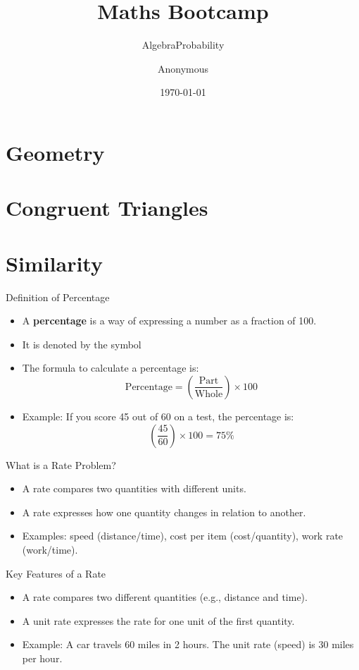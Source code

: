 \documentclass{beamer}
\title{Maths Bootcamp}
\author{Anonymous}
\institute{Overleaf}
\date{\today}
\begin{document}
\frame{\titlepage}

\section{Geometry}
\subsection{}
\section{Congruent Triangles}
\section{Similarity }
\subtitle{Algebra}
\subtitle{Probability}

\begin{frame}{Definition of Percentage}
    \begin{itemize}
        \item A \textbf{percentage} is a way of expressing a number as a fraction of 100.
        \item It is denoted by the symbol 
        \item The formula to calculate a percentage is:
        $$
        \text{Percentage} = \left( \frac{\text{Part}}{\text{Whole}} \right) \times 100
        $$
        \item Example: If you score 45 out of 60 on a test, the percentage is:
      $$  
        \left( \frac{45}{60} \right) \times 100 = 75\%
       $$
    \end{itemize}
\end{frame}

\begin{frame}{What is a Rate Problem?}
    \begin{itemize}
        \item A rate compares two quantities with different units.
        \item A rate expresses how one quantity changes in relation to another.
        \item Examples: speed (distance/time), cost per item (cost/quantity), work rate (work/time).
    \end{itemize}
\end{frame}

\begin{frame}{Key Features of a Rate}
    \begin{itemize}
        \item A rate compares two different quantities (e.g., distance and time).
        \item A unit rate expresses the rate for one unit of the first quantity.
        \item Example: A car travels 60 miles in 2 hours. The unit rate (speed) is 30 miles per hour.
    \end{itemize}
\end{frame}
\end{document}
